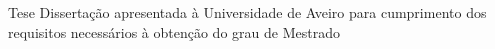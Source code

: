 
\TitlePage
\HEADER{}{\ThesisYear}
      {Tese}
\vspace*{15mm}
\TEXT{}
     {Dissertação apresentada à Universidade de Aveiro para cumprimento dos requisitos necessários à obtenção do grau de Mestrado}
\EndTitlePage
\titlepage\ \endtitlepage %

